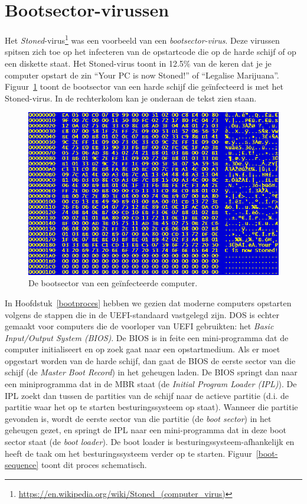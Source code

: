 \section{Bootsector-virussen}

Het \emph{Stoned}-virus\footnote{\url{https://en.wikipedia.org/wiki/Stoned_(computer_virus)}} was een voorbeeld van een \emph{bootsector-virus}. Deze virussen spitsen zich toe op het infecteren van de opstartcode die op de harde schijf of op een diskette staat. Het Stoned-virus toont in 12.5\% van de keren dat je je computer opstart de zin ``Your PC is now Stoned!'' of ``Legalise Marijuana''. Figuur~\ref{stoned} toont de bootsector van een harde schijf die ge\"infecteerd is met het Stoned-virus. In de rechterkolom kan je onderaan de tekst zien staan.

\begin{figure}
\begin{center}
\includegraphics[width=120mm]{images/stoned.png}
\end{center}
\caption{De bootsector van een ge\"infecteerde computer.}
\label{stoned}
\end{figure}

In Hoofdstuk~\ref{bootproces} hebben we gezien dat moderne computers opstarten volgens de stappen die in de UEFI-standaard vastgelegd zijn. DOS is echter gemaakt voor computers die de voorloper van UEFI gebruikten: het \emph{Basic Input/Output System (BIOS)}. De BIOS is in feite een mini-programma dat de computer initialiseert en op zoek gaat naar een opstartmedium. Als er moet opgestart worden van de harde schijf, dan gaat de BIOS de eerste sector van die schijf (de \emph{Master Boot Record}) in het geheugen laden. De BIOS springt dan naar een miniprogramma dat in de MBR staat (de \emph{Initial Program Loader (IPL)}). De IPL zoekt dan tussen de partities van de schijf naar de actieve partitie (d.i. de partitie waar het op te starten besturingssysteem op staat). Wanneer die partitie gevonden is, wordt de eerste sector van die partitie (de \emph{boot sector}) in het geheugen gezet, en springt de IPL naar een mini-programma dat in deze boot sector staat (de \emph{boot loader}). De boot loader is besturingssysteem-afhankelijk en heeft de taak om het besturingssysteem verder op te starten. Figuur~\ref{boot-sequence} toont dit proces schematisch.

